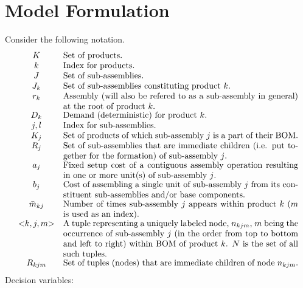\documentclass[twoside,onecolumn,12pt,letterpaper]{article}
\begin{document}
\section{Model Formulation \label{section:model_formulation}}
Consider the following notation.
\begin{align*} 
\begin{matrix} 
K & \parbox[t]{0.8\textwidth}{Set of products.}\\
k & \parbox[t]{0.8\textwidth}{Index for products.} \\
J & \parbox[t]{0.8\textwidth}{Set of sub-assemblies.}\\
J_k & \parbox[t]{0.8\textwidth}{Set of sub-assemblies constituting product $k$.}\\
r_k & \parbox[t]{0.8\textwidth}{Assembly (will also be refered to as a sub-assembly in general) at the root of product $k$.}\\
D_k & \parbox[t]{0.8\textwidth}{Demand (deterministic) for product $k$.}\\
j,l & \parbox[t]{0.8\textwidth}{Index for sub-assemblies.} \\
K_j & \parbox[t]{0.8\textwidth}{Set of products of which sub-assembly $j$ is a part of their BOM.}\\
R_j & \parbox[t]{0.8\textwidth}{Set of sub-assemblies that are immediate children (i.e. put together for the formation) of sub-assembly $j$.}\\
a_j & \parbox[t]{0.8\textwidth}{Fixed setup cost of a contiguous assembly operation resulting in one or more unit(s) of sub-assembly $j$.} \\
b_j & \parbox[t]{0.8\textwidth}{Cost of assembling a single unit of sub-assembly $j$ from its constituent sub-assemblies and/or base components.} \\
\bar{m}_{kj} & \parbox[t]{0.8\textwidth}{Number of times sub-assembly $j$ appears within product $k$ ($m$ is used as an index).} \\
{<}k,j,m{>} & \parbox[t]{0.8\textwidth}{A tuple representing a uniquely labeled node, $n_{kjm}$,  $m$ being the occurrence of sub-assembly $j$ (in the order from top to bottom and left to right) within BOM of  product $k$. $N$ is the set of all such tuples.} \\
R_{kjm} & \parbox[t]{0.8\textwidth}{Set of tuples (nodes) that are immediate children of node $n_{kjm}$.}
\end{matrix}
\end{align*}
Decision variables:
\end{document}
